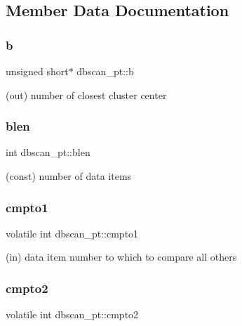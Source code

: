 \subsection{Member Data Documentation}
\mbox{\label{structdbscan__pt_aab10762fb46be396c06f36c7b8f84f64}} 
\subsubsection{\texorpdfstring{b}{b}}
{\footnotesize\ttfamily unsigned short$\ast$ dbscan\+\_\+pt\+::b}



(out) number of closest cluster center 

\mbox{\label{structdbscan__pt_ac172b388c85db693e07e954f7d29e681}} 
\subsubsection{\texorpdfstring{blen}{blen}}
{\footnotesize\ttfamily int dbscan\+\_\+pt\+::blen}



(const) number of data items 

\mbox{\label{structdbscan__pt_a50b8b3c19e72c2496e04595da3466fc6}} 
\subsubsection{\texorpdfstring{cmpto1}{cmpto1}}
{\footnotesize\ttfamily volatile int dbscan\+\_\+pt\+::cmpto1}



(in) data item number to which to compare all others 

\mbox{\label{structdbscan__pt_ae90fa8f34589191559422b8d49321675}} 
\subsubsection{\texorpdfstring{cmpto2}{cmpto2}}
{\footnotesize\ttfamily volatile int dbscan\+\_\+pt\+::cmpto2}




